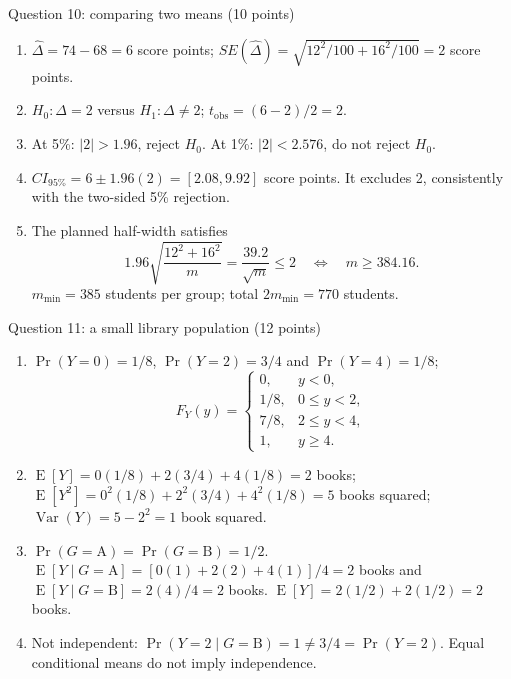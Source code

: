 \documentclass[a4paper,11pt,twoside]{article}
\newcommand{\E}{\operatorname{E}}
\newcommand{\Var}{\operatorname{Var}}
\newcommand{\heading}[1]{\par\medskip\noindent #1\par\nobreak\smallskip}
\begin{document}
\heading{Question 10: comparing two means (10 points)}
\begin{enumerate}[label=(\alph*),leftmargin=*,itemsep=2pt,topsep=2pt]
\item $\widehat\Delta=74-68=6$ score points;
$SE(\widehat\Delta)=\sqrt{12^2/100+16^2/100}=2$ score points.
\item $H_0:\Delta=2$ versus $H_1:\Delta\ne2$;
$t_{\mathrm{obs}}=(6-2)/2=2$.
\item At 5\%: $|2|>1.96$, reject $H_0$.
At 1\%: $|2|<2.576$, do not reject $H_0$.
\item $CI_{95\%}=6\pm1.96(2)=[2.08,9.92]$ score points.
It excludes 2, consistently with the two-sided 5\% rejection.
\item The planned half-width satisfies
\[
1.96\sqrt{\frac{12^2+16^2}{m}}=\frac{39.2}{\sqrt m}\leq2
\quad\Longleftrightarrow\quad m\geq384.16.
\]
$m_{\min}=385$ students per group; total $2m_{\min}=770$ students.
\end{enumerate}

\Needspace{5cm}
\heading{Question 11: a small library population (12 points)}
\begin{enumerate}[label=(\alph*),leftmargin=*,itemsep=2pt,topsep=2pt]
\item $\Pr(Y=0)=1/8$, $\Pr(Y=2)=3/4$ and $\Pr(Y=4)=1/8$;
\[
F_Y(y)=\begin{cases}
0,&y<0,\\
1/8,&0\leq y<2,\\
7/8,&2\leq y<4,\\
1,&y\geq4.
\end{cases}
\]
\item $\E[Y]=0(1/8)+2(3/4)+4(1/8)=2$ books;
$\E[Y^2]=0^2(1/8)+2^2(3/4)+4^2(1/8)=5$ books squared;
$\Var(Y)=5-2^2=1$ book squared.
\item $\Pr(G=\mathrm A)=\Pr(G=\mathrm B)=1/2$.
$\E[Y\mid G=\mathrm A]=[0(1)+2(2)+4(1)]/4=2$ books and
$\E[Y\mid G=\mathrm B]=2(4)/4=2$ books.
$\E[Y]=2(1/2)+2(1/2)=2$ books.
\item Not independent:
$\Pr(Y=2\mid G=\mathrm B)=1\ne3/4=\Pr(Y=2)$.
Equal conditional means do not imply independence.
\end{enumerate}
\end{document}
